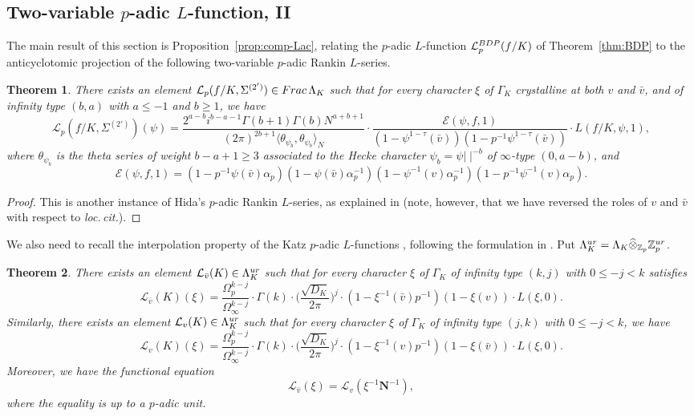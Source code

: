 \documentclass[a4paper,10pt]{amsart}
\numberwithin{equation}{section}
\numberwithin{equation}{section}
\theoremstyle{plain}
\newtheorem{thm}{Theorem}[subsection] %
\theoremstyle{definition}
\theoremstyle{definition}
\theoremstyle{plain}
\theoremstyle{plain}
\theoremstyle{plain}
\theoremstyle{plain}
\newcommand{\Z}{\mathbb{Z}}
\newcommand{\Lcal}{\mathcal{L}}
\begin{document}
\subsection{Two-variable $p$-adic $L$-function, II}
\label{subsec:L-2var-II} 

The main result of this section is Proposition~\ref{prop:comp-Lac}, relating the %
$p$-adic $L$-function $\Lcal_p^{\rm BDP}(f/K)$ of Theorem~\ref{thm:BDP} to the anticyclotomic projection of the following two-variable $p$-adic Rankin $L$-series. 


\begin{thm}\label{thm:Hida-2}
\label{thm:Gr}
There exists an element $\Lcal_p(f/K,\Sigma^{(2')})\in{\rm Frac}\,\Lambda_K$ such that for every character $\xi$ of $\Gamma_K$ 
crystalline at both $v$ and $\bar{v}$, and of infinity type $(b,a)$ with $a\leq -1$ and $b\geq 1$, we have
\[
\Lcal_p(f/K,\Sigma^{(2')})(\psi)=\frac{2^{a-b}i^{b-a-1}\Gamma(b+1)\Gamma(b)N^{a+b+1}}{(2\pi)^{2b+1}\langle\theta_{\psi_b},\theta_{\psi_b}\rangle_N}\cdot\frac{\mathcal{E}(\psi,f,1)}{(1-\psi^{1-\tau}(\bar{v}))(1-p^{-1}\psi^{1-\tau}(\bar{v}))}\cdot L(f/K,\psi,1),
\]
where $\theta_{\psi_b}$ is the theta series of weight $b-a+1\geq 3$ associated to the Hecke character $\psi_b=\psi\vert\;\vert^{-b}$ of $\infty$-type $(0,a-b)$, and 
\[
\mathcal{E}(\psi,f,1)=(1-p^{-1}\psi(\bar{v})\alpha_p)(1-\psi(\bar{v})\alpha^{-1}_p)(1-\psi^{-1}({v})\alpha_p^{-1})(1-p^{-1}\psi^{-1}({v})\alpha_p).
\]
\end{thm}

\begin{proof}
This is another instance of Hida's $p$-adic Rankin $L$-series, as explained in \cite[Thm.~6.1.3]{LLZ-K} (note, however, that we have reversed the roles of $v$ and $\bar{v}$ with respect to \emph{loc.\,cit.}).
\end{proof}

We also need to recall the interpolation property of the Katz $p$-adic $L$-functions \cite{katz}, following the formulation in \cite{deshalit}. Put $\Lambda_K^{\rm ur}=\Lambda_K\widehat\otimes_{\Z_p}\Z_p^{\rm ur}$.

\begin{thm}\label{thm:katz}
There exists an element $\Lcal_{\bar{v}}(K)\in\Lambda_K^{\rm ur}$ such that for every character $\xi$ of $\Gamma_K$ of infinity type $(k,j)$ with $0\leq-j<k$ satisfies 
\[
\Lcal_{\bar{v}}(K)(\xi)=\frac{\Omega_p^{k-j}}{\Omega_\infty^{k-j}}\cdot\Gamma(k)\cdot\biggl(\frac{\sqrt{D_K}}{2\pi}\biggr)^j\cdot(1-\xi^{-1}(\bar{v})p^{-1})(1-\xi({v}))\cdot L(\xi,0).
\]
Similarly, there exists an element $\Lcal_v(K)\in\Lambda_K^{\rm ur}$ such that for every character $\xi$ of $\Gamma_K$ of infinity type $(j,k)$ with $0\leq-j<k$, we have 
\[
\Lcal_{v}(K)(\xi)=\frac{\Omega_p^{k-j}}{\Omega_\infty^{k-j}}\cdot\Gamma(k)\cdot\biggl(\frac{\sqrt{D_K}}{2\pi}\biggr)^j\cdot(1-\xi^{-1}({v})p^{-1})(1-\xi(\bar{v}))\cdot L(\xi,0).
\]
Moreover, we have the functional equation 
\[
\Lcal_{\bar{v}}(\xi)=\Lcal_{v}(\xi^{-1}\mathbf{N}^{-1}),
\] 
where the equality is up to a $p$-adic unit.
\end{thm}
\end{document}
